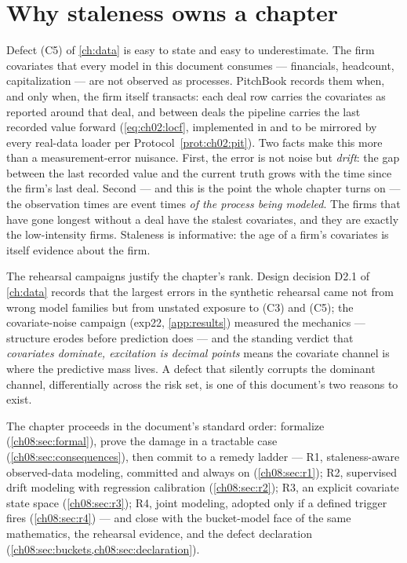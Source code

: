 
\section{Why staleness owns a chapter}\label{ch08:sec:problem}

Defect (C5) of \cref{ch:data} is easy to state and easy to underestimate.
The firm covariates that every model in this document consumes ---
financials, headcount, capitalization --- are not observed as processes.
PitchBook records them when, and only when, the firm itself transacts:
each deal row carries the covariates as reported around that deal, and
between deals the pipeline carries the last recorded value forward
(\cref{eq:ch02:locf}, implemented in  and to be
mirrored by every real-data loader per Protocol~\ref{prot:ch02:pit}). Two facts
make this more than a measurement-error nuisance. First, the error is not
noise but \emph{drift}: the gap between the last recorded value and the
current truth grows with the time since the firm's last deal. Second ---
and this is the point the whole chapter turns on --- the observation times
are event times \emph{of the process being modeled}. The firms that have
gone longest without a deal have the stalest covariates, and they are
exactly the low-intensity firms. Staleness is informative: the age of a
firm's covariates is itself evidence about the firm.

The rehearsal campaigns justify the chapter's rank. Design decision D2.1
of \cref{ch:data} records that the largest errors in the synthetic
rehearsal came not from wrong model families but from unstated exposure to
(C3) and (C5); the covariate-noise campaign (exp22, \cref{app:results})
measured the mechanics --- structure erodes before prediction does --- and
the standing verdict that \emph{covariates dominate, excitation is decimal
points} means the covariate channel is where the predictive mass lives.
A defect that silently corrupts the dominant channel, differentially
across the risk set, is one of this document's two reasons to exist.

The chapter proceeds in the document's standard order: formalize
(\cref{ch08:sec:formal}), prove the damage in a tractable case
(\cref{ch08:sec:consequences}), then commit to a remedy ladder --- R1,
staleness-aware observed-data modeling, committed and always on
(\cref{ch08:sec:r1}); R2, supervised drift modeling with regression
calibration (\cref{ch08:sec:r2}); R3, an explicit covariate state space
(\cref{ch08:sec:r3}); R4, joint modeling, adopted only if a defined
trigger fires (\cref{ch08:sec:r4}) --- and close with the bucket-model
face of the same mathematics, the rehearsal evidence, and the defect
declaration (\cref{ch08:sec:buckets,ch08:sec:declaration}).

